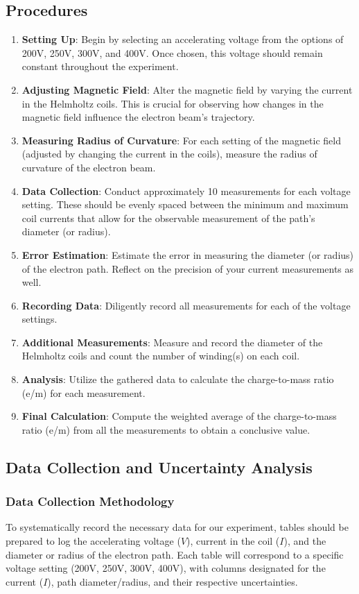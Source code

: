 \documentclass{article}
\begin{document}
\subsection{Procedures}
\begin{enumerate}
    \item \textbf{Setting Up}: Begin by selecting an accelerating voltage from the options of 200V, 250V, 300V, and 400V. Once chosen, this voltage should remain constant throughout the experiment.
    \item \textbf{Adjusting Magnetic Field}: Alter the magnetic field by varying the current in the Helmholtz coils. This is crucial for observing how changes in the magnetic field influence the electron beam's trajectory.
    \item \textbf{Measuring Radius of Curvature}: For each setting of the magnetic field (adjusted by changing the current in the coils), measure the radius of curvature of the electron beam.
    \item \textbf{Data Collection}: Conduct approximately 10 measurements for each voltage setting. These should be evenly spaced between the minimum and maximum coil currents that allow for the observable measurement of the path's diameter (or radius).
    \item \textbf{Error Estimation}: Estimate the error in measuring the diameter (or radius) of the electron path. Reflect on the precision of your current measurements as well.
    \item \textbf{Recording Data}: Diligently record all measurements for each of the voltage settings.
    \item \textbf{Additional Measurements}: Measure and record the diameter of the Helmholtz coils and count the number of winding(s) on each coil.
    \item \textbf{Analysis}: Utilize the gathered data to calculate the charge-to-mass ratio (e/m) for each measurement.
    \item \textbf{Final Calculation}: Compute the weighted average of the charge-to-mass ratio (e/m) from all the measurements to obtain a conclusive value.
\end{enumerate}


\subsection{Data Collection and Uncertainty Analysis}
\label{subsec:data-collection-uncertainty-analysis}

\subsubsection{Data Collection Methodology}
To systematically record the necessary data for our experiment, tables should be prepared to log the accelerating voltage (\(V\)), current in the coil (\(I\)), and the diameter or radius of the electron path. Each table will correspond to a specific voltage setting (200V, 250V, 300V, 400V), with columns designated for the current (\(I\)), path diameter/radius, and their respective uncertainties.
\end{document}

